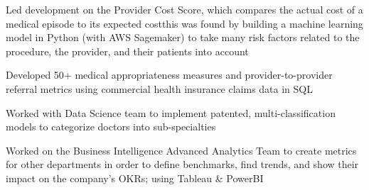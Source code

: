 \documentclass[a4paper]{deedy-resume-openfont} %
\begin{document}
\begin{minipage}[t]{0.66\textwidth}
\begin{tightitemize}
	\item Led development on the Provider Cost Score, which compares the actual cost of a medical episode to its expected cost\textemdash this was found by building a machine learning model in Python (with AWS Sagemaker) to take many risk factors related to the procedure, the provider, and their patients into account %
	\item Developed 50+ medical appropriateness measures and provider-to-provider referral metrics using commercial health insurance claims data in SQL %
	\item Worked with Data Science team to implement patented, multi-classification models to categorize doctors into sub-specialties
\end{tightitemize}

\begin{tightitemize}
	\item Worked on the Business Intelligence Advanced Analytics Team to create metrics for other departments in order to define benchmarks, find trends, and show their impact on the company's OKRs; using Tableau \& PowerBI
\end{tightitemize}



\end{minipage}
\end{document}
